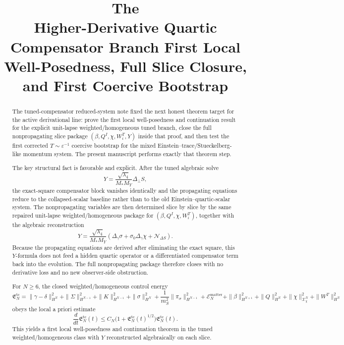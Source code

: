 \documentclass[11pt]{article}
\title{\textbf{The \TheoryName{}}\\[0.4em]
\large Higher-Derivative Quartic Compensator Branch First Local Well-Posedness, Full Slice Closure, and First Coercive Bootstrap}
\author{}
\date{}
\begin{document}
\maketitle

\begin{abstract}
The tuned-compensator reduced-system note fixed the next honest theorem target for the active derivational line: prove the first local well-posedness and continuation result for the explicit unit-lapse weighted/homogeneous tuned branch, close the full nonpropagating slice package \((\beta,Q^I,\chi,W_i^T,Y)\) inside that proof, and then test the first corrected \(T\sim\varepsilon^{-1}\) coercive bootstrap for the mixed Einstein--trace/Stueckelberg-like momentum system. The present manuscript performs exactly that theorem step.

The key structural fact is favorable and explicit. After the tuned algebraic solve
\[
Y=\frac{\sqrt{\lambda_4}}{M_*M_Y}\Delta_\perp S,
\]
the exact-square compensator block vanishes identically and the propagating equations reduce to the collapsed-scalar baseline rather than to the old Einstein--quartic-scalar system. The nonpropagating variables are then determined slice by slice by the same repaired unit-lapse weighted/homogeneous package for \((\beta,Q^I,\chi,W_i^T)\), together with the algebraic reconstruction
\[
Y=
\frac{\sqrt{\lambda_4}}{M_*M_Y}
\left(
\Delta_\gamma\sigma+\sigma_0\Delta_\gamma\chi+\mathcal N_{\Delta S}
\right).
\]
Because the propagating equations are derived after eliminating the exact square, this \(Y\)-formula does not feed a hidden quartic operator or a differentiated compensator term back into the evolution. The full nonpropagating package therefore closes with no derivative loss and no new observer-side obstruction.

For \(N\ge 6\), the closed weighted/homogeneous control energy
\[
\mathfrak E_N^{\mathrm{tc}}
=
\|\gamma-\delta\|_{H^N}^2
+\|\Sigma\|_{H^{N-1}}^2
+\|K\|_{H^{N-1}}^2
+\|\sigma\|_{H^N}^2
+\frac{1}{m_S^2}\|\pi_\sigma\|_{H^{N-1}}^2
+\mathcal E_N^{\mathrm{matter}}
+\|\beta\|_{H^{N+1}}^2
+\|Q\|_{H^N}^2
+\|\chi\|_{\mathcal X_\chi^N}^2
+\|W^T\|_{H^N}^2
\]
obeys the local a priori estimate
\[
\frac{d}{dt}\mathfrak E_N^{\mathrm{tc}}(t)
\le
C_N\bigl(1+\mathfrak E_N^{\mathrm{tc}}(t)^{1/2}\bigr)\mathfrak E_N^{\mathrm{tc}}(t).
\]
This yields a first local well-posedness and continuation theorem in the tuned weighted/homogeneous class with \(Y\) reconstructed algebraically on each slice.


\end{abstract}
\end{document}
